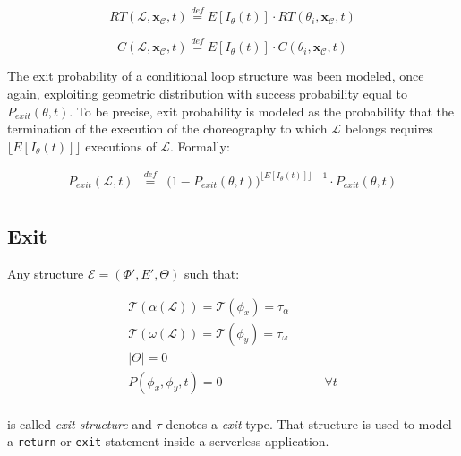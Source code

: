 \documentclass[12pt,a4paper]{report}
\newcommand{\mathDef}{\overset{\textit{def}}{=}}
\begin{document}
\begin{equation}
	RT(\mathcal{L},\textbf{x}_{\mathcal{C}}, t) \mathDef E[I_{\theta}(t)] \cdot RT(\theta_i,\textbf{x}_{\mathcal{C}}, t)
\end{equation}

\begin{equation}
	C(\mathcal{L},\textbf{x}_{\mathcal{C}}, t) \mathDef E[I_{\theta}(t)] \cdot C(\theta_i,\textbf{x}_{\mathcal{C}}, t)
\end{equation}

The exit probability of a conditional loop structure was been modeled, once again, exploiting geometric distribution with success probability equal to $P_{exit}(\theta, t)$. To be precise, exit probability is modeled as the probability that the termination of the execution of the choreography to which $\mathcal{L}$ belongs requires $\lfloor E[I_{\theta}(t)] \rfloor$  executions of $\mathcal{L}$. Formally:

\begin{eqnarray}
	P_{exit}(\mathcal{L}, t) & \mathDef & \Big(1 -P_{exit}(\theta, t)  \Big)^{\lfloor E[I_{\theta}(t)] \rfloor - 1} \cdot P_{exit}(\theta, t)\\
\end{eqnarray}

\subsection{Exit}

Any structure $\mathcal{E} = (\Phi',E',\Theta)$ such that:

\begin{eqnarray}
	\mathscr{T}(\alpha(\mathcal{L})) = \mathscr{T}(\phi_x) = \tau_{\alpha} \\ \mathscr{T}(\omega(\mathcal{L})) = \mathscr{T}(\phi_y) = \tau_{\omega} \\
	|\Theta| = 0  & \\
	P(\phi_{x}, \phi_{y},t) = 0 & \qquad \forall t \\
\end{eqnarray}

is called \textit{exit structure} and $\tau$ denotes a \textit{exit} type. That structure is used to model a \texttt{return} or \texttt{exit} statement inside a serverless application. 
\end{document}
